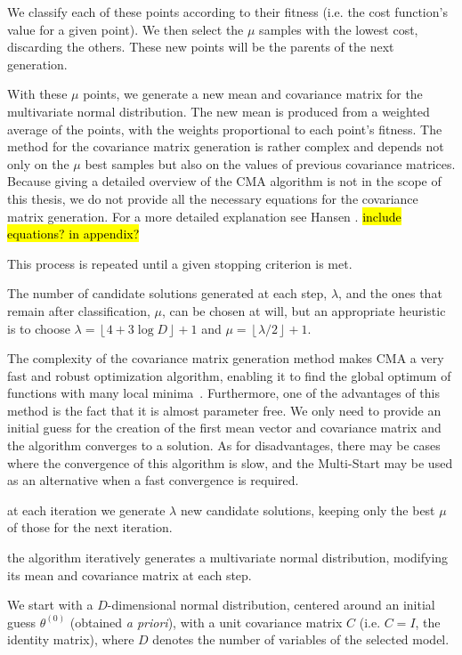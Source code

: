 We classify each of these points according to their fitness (i.e. the cost function's value for a given point). We then select the $\mu$ samples with the lowest cost, discarding the others. These new points will be the parents of the next generation.

With these $\mu$ points, we generate a new mean and covariance matrix for the multivariate normal distribution. The new mean is produced from a weighted average of the points, with the weights proportional to each point's fitness.
The method for the covariance matrix generation is rather complex and depends not only on the $\mu$ best samples but also on the values of previous covariance matrices. Because giving a detailed overview of the CMA algorithm is not in the scope of this thesis, we do not provide all the necessary equations for the covariance matrix generation. For a more detailed explanation see Hansen \cite{Hansen}.
\hl{include equations? in appendix?}


This process is repeated until a given stopping criterion is met.

The number of candidate solutions generated at each step, $\lambda$, and the ones that remain after classification, $\mu$, can be chosen at will, but an appropriate heuristic is to choose $\lambda=\left\lfloor4+3\log D\right\rfloor+1$ and $\mu=\left\lfloor\lambda/2\right\rfloor+1$.

The complexity of the covariance matrix generation method makes CMA a very fast and robust optimization algorithm, enabling it to find the global optimum of functions with many local minima~\cite{DilaoCMA}.
Furthermore, one of the advantages of this method is the fact that it is almost parameter free. We only need to provide an initial guess for the creation of the first mean vector and covariance matrix and the algorithm converges to a solution.
As for disadvantages, there may be cases where the convergence of this algorithm is slow, and the Multi-Start may be used as an alternative when a fast convergence is required.


\iffalse
 at each iteration we generate $\lambda$ new candidate solutions, keeping only the best $\mu$ of those for the next iteration.

the algorithm iteratively generates a multivariate normal distribution, modifying its mean and covariance matrix at each step.

We start with a $D$-dimensional normal distribution, centered around an initial guess $\theta^{(0)}$ (obtained \textit{a priori}), with a unit covariance matrix $C$ (i.e. $C=I$, the identity matrix), where $D$ denotes the number of variables of the selected model.

